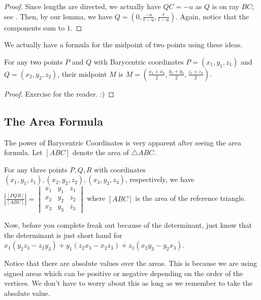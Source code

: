 \documentclass[11pt]{scrartcl}
\begin{document}
\begin{proof}
  Since lengths are directed, we actually have $QC=-u$ as $Q$ is on ray $BC$; see . Then, by our lemma, we have $Q=(0,\frac{-u}{t-u},\frac{t}{t-u})$. Again, notice that the components sum to $1$.  
\end{proof}

We actually have a formula for the midpoint of two points using these ideas.

\begin{theorem}
    For any two points $P$ and $Q$ with Barycentric coordinates $P=(x_1,y_1,z_1)$ and $Q=(x_2,y_2,z_2)$, their midpoint $M$ is $M=(\frac{x_1+x_2}2,\frac{y_1+y_2}2,\frac{z_1+z_2}2)$.
\end{theorem}

\begin{proof}
    Exercise for the reader. :)
\end{proof}

\subsection{The Area Formula}

The power of Barycentric Coordinates is very apparent after seeing the area formula. Let $[ABC]$ denote the area of $\triangle ABC$. 

\begin{theorem}
    For any three points $P,Q,R$ with coordinates $(x_1,y_1,z_1),(x_2,y_2,z_2),(x_3,y_3,z_3)$, respectively, we have $|\frac{[PQR]}{[ABC]}|=
\begin{vmatrix}
x_{1} &y_{1}  &z_{1} \\ 
x_{2} &y_{2}  &z_{2} \\ 
 x_{3}& y_{3} & z_{3}
\end{vmatrix}$ where $[ABC]$ is the area of the reference triangle.
\end{theorem}

Now, before you complete freak out because of the determinant, just know that the determinant is just short hand for $x_1(y_2z_3-z_2y_3)+y_1(z_2x_3-x_2z_3)+z_1(x_2y_3-y_2x_3)$.\\

\begin{remark}
    Notice that there are absolute values over the areas. This is because we are using signed areas which can be positive or negative depending on the order of the vertices. We don't have to worry about this as long as we remember to take the absolute value.
\end{remark}
\end{document}
